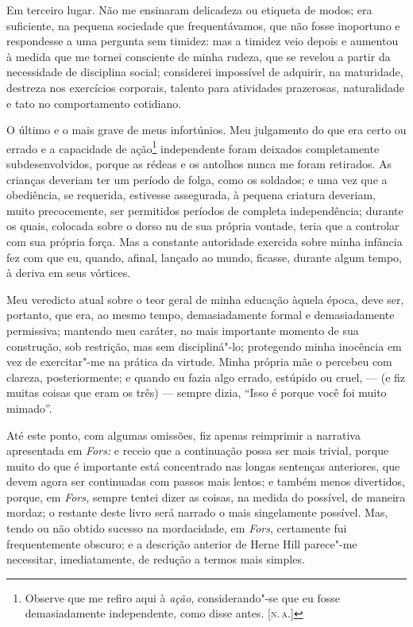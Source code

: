 Em terceiro lugar. Não me ensinaram delicadeza ou etiqueta de modos;
era suficiente, na pequena sociedade que frequentávamos, que não fosse
inoportuno e respondesse a uma pergunta sem timidez: mas a timidez veio
depois e aumentou à medida que me tornei consciente de minha rudeza, que
se revelou a partir da necessidade de disciplina social; considerei
impossível de adquirir, na maturidade, destreza nos exercícios
corporais, talento para atividades prazerosas, naturalidade e tato no
comportamento cotidiano.

O último e o mais grave de meus infortúnios. Meu julgamento do que
era certo ou errado e a capacidade de ação\footnote{Observe que me
  refiro aqui à \textit{ação}, considerando"-se que eu fosse demasiadamente
  independente, como disse antes. {[}\textsc{n.\,a.}{]}} independente foram
deixados completamente subdesenvolvidos, porque as rédeas e os antolhos
nunca me foram retirados. As crianças deveriam ter um período de folga,
como os soldados; e uma vez que a obediência, se requerida, estivesse
assegurada, à pequena criatura deveriam, muito precocemente, ser
permitidos períodos de completa independência; durante os quais,
colocada sobre o dorso nu de sua própria vontade, teria que a controlar
com sua própria força. Mas a constante autoridade exercida sobre minha
infância fez com que eu, quando, afinal, lançado ao mundo, ficasse,
durante algum tempo, à deriva em seus vórtices.

Meu veredicto atual sobre o teor geral de minha educação àquela
época, deve ser, portanto, que era, ao mesmo tempo, demasiadamente
formal e demasiadamente permissiva; mantendo meu caráter, no mais
importante momento de sua construção, sob restrição, mas sem
discipliná"-lo; protegendo minha inocência em vez de exercitar"-me na
prática da virtude. Minha própria mãe o percebeu com clareza,
posteriormente; e quando eu fazia algo errado, estúpido ou cruel, --- (e
fiz muitas coisas que eram os três) --- sempre dizia, ``Isso é porque
você foi muito mimado''.

Até este ponto, com algumas omissões, fiz apenas reimprimir a
narrativa apresentada em \textit{Fors:} e receio que a continuação possa
ser mais trivial, porque muito do que é importante está concentrado nas
longas sentenças anteriores, que devem agora ser continuadas com passos
mais lentos; e também menos divertidos, porque, em \textit{Fors,} sempre
tentei dizer as coisas, na medida do possível, de maneira mordaz; o
restante deste livro será narrado o mais singelamente possível. Mas,
tendo ou não obtido sucesso na mordacidade, em \textit{Fors}, certamente
fui frequentemente obscuro; e a descrição anterior de Herne Hill
parece"-me necessitar, imediatamente, de redução a termos mais simples.


